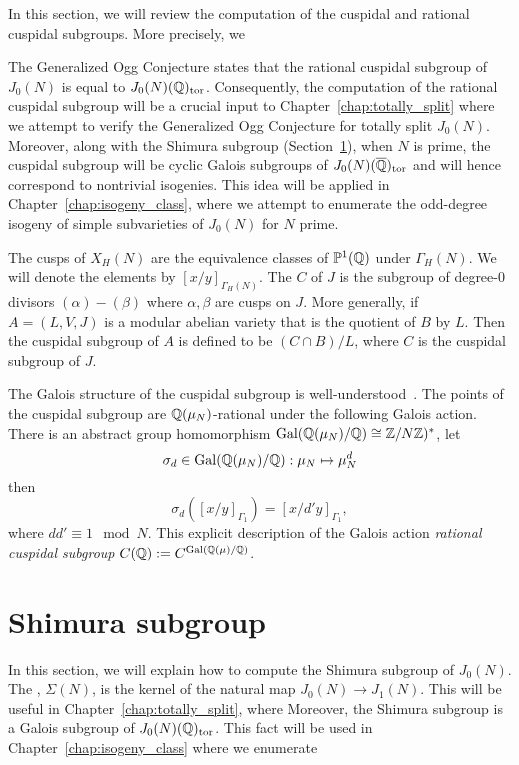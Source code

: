 In this section, we will review the computation of the cuspidal and rational
cuspidal subgroups. More precisely, we %

The Generalized Ogg Conjecture states that the rational
cuspidal subgroup of $J_0(N)$ is equal to $J_0(N)(\mathbb{Q})_{\mathrm{tor}}$. Consequently, the
computation of the rational cuspidal subgroup will be a crucial input to
Chapter~\ref{chap:totally_split} where we attempt to verify the Generalized Ogg
Conjecture for totally split $J_0(N)$. Moreover, along with the Shimura
subgroup (Section~\ref{sec:shimura_subgroup}), when $N$ is prime, the cuspidal
subgroup will be cyclic Galois subgroups of $J_0(N)(\overline{\mathbb{Q}})_{\mathrm{tor}}$ and will
hence correspond to nontrivial isogenies. This idea will be applied in
Chapter~\ref{chap:isogeny_class}, where we attempt to enumerate the odd-degree
isogeny of simple subvarieties of $J_0(N)$ for $N$ prime.

The cusps of $X_H(N)$ are the equivalence classes of $\mathbb{P}^1(\mathbb{Q})$ under
$\Gamma_H(N)$. We will denote the elements by $[x/y]_{\Gamma_H(N)}$. The
 $C$ of $J$ is the subgroup of degree-0 divisors
$(\alpha)-(\beta)$ where $\alpha, \beta$ are cusps on $J$. More generally, if
$A=(L, V, J)$ is a modular abelian variety that is the quotient of $B$ by $L$.
Then the cuspidal subgroup of $A$ is defined to be $(C\cap B)/L$, where $C$ is
the cuspidal subgroup of $J$.

The Galois structure of the cuspidal subgroup is well-understood~\cite[\S
1.3]{stevens:thesis}. The points of the cuspidal subgroup are
$\mathbb{Q}(\mu_N)$-rational under the following Galois action. There is an abstract
group homomorphism $\operatorname{Gal}(\mathbb{Q}(\mu_N)/\mathbb{Q})\cong \mathbb{Z}/N\mathbb{Z})^*$, let
\[
    \sigma_d\in \operatorname{Gal}(\mathbb{Q}(\mu_N)/\mathbb{Q}):\mu_N\mapsto \mu_N ^d
\]
then
\[
    \sigma_d([x/y]_{\Gamma_1})=[x/d'y]_{\Gamma_1},
\]
where $dd'\equiv 1 \mod{N}$. This explicit description of the Galois action
\emph{rational cuspidal subgroup} $C(\mathbb{Q}):=C^{\operatorname{Gal}(\mathbb{Q}(\mu)/\mathbb{Q})}$.

\section{Shimura subgroup}%
\label{sec:shimura_subgroup}

In this section, we will explain how to compute the Shimura subgroup of
$J_0(N)$. The , $\Sigma(N)$, is the kernel of the
natural map $J_0(N)\to J_1(N)$. This will be useful in
Chapter~\ref{chap:totally_split}, where 
Moreover, the Shimura subgroup is a Galois subgroup of $J_0(N)(\mathbb{Q})_{\mathrm{tor}}$. This
fact will be used in Chapter~\ref{chap:isogeny_class} where we enumerate

